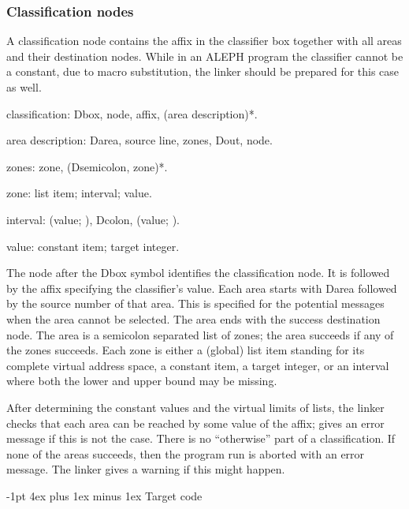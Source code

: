 \documentclass[titlepage]{article}
\makeatletter
\newcommand\A{\textsf{ALEPH}}
\newcommand\g[1]{\textsf{#1}}
\newenvironment{grammar}{%
\begin{list}{}{%
\setlength\leftmargin{18pt}%
\setlength\rightmargin{-5pt}%
\setlength\listparindent{20pt}%
\setlength\itemsep{1pt plus0.2ex}%
\setlength\parsep{0pt plus 2pt}%
\setlength\labelsep{-5pt}%
}\sf\mkoptions%
}{\end{list}}
\renewcommand\section{%
\newpage
\@startsection{section}{1}{\z@}%
   {-1pt}%
   {4ex plus 1ex minus 1ex}%
   {\normalfont\Large\bfseries}}
\let\osection\section
\def\section {\newpage\osection}
\makeatother
\begin{document}
\subsubsection{Classification nodes}

A classification node contains the affix in the classifier box together with
all areas and their destination nodes. While in an \A{} program the classifier
cannot be a constant, due to macro substitution, the linker should be prepared
for this case as well.
\begin{grammar}
\item classification: Dbox, node, affix, (area description)*.
\item area description: Darea, source line, zones, Dout, node.
\item zones: zone, (Dsemicolon, zone)*.
\item zone: list item; interval; value.
\item interval: (value; ), Dcolon, (value; ).
\item value: constant item; target integer.
\end{grammar}
The \g{node} after the \g{Dbox} symbol identifies the classification node.
It is followed by the affix specifying the classifier's value. Each area
starts with \g{Darea} followed by the source number of that area. This is
specified for the potential messages when the area cannot be selected. The
area ends with the success destination node. The area is a semicolon
separated list of \g{zone}s; the area succeeds if any of the zones succeeds.
Each \g{zone} is either a (global) list item standing for its complete
virtual address space, a constant item, a target integer, or an \g{interval}
where both the lower and upper bound may be missing.

After determining the constant values and the virtual limits of lists, the
linker checks that each area can be reached by some value of the \g{affix};
gives an error message if this is not the case. There is no
``otherwise'' part of a classification. If none of the areas succeeds, then
the program run is aborted with an error message. The linker gives a warning
if this might happen.





\section{Target code}
\end{document}
